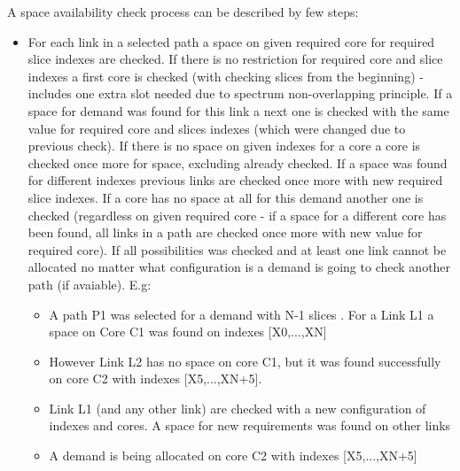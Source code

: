\documentclass[conference]{IEEEtran}
\begin{document}
A space availability check process can be described by few steps:
\begin{itemize}
\item For each link in a selected path a space on given required core for required slice indexes are checked. If there is no restriction for required core and slice indexes a first core is checked (with checking slices from the beginning) - includes one extra slot needed due to spectrum non-overlapping principle. If a space for demand was found for this link a next one is checked with the same value for required core and slices indexes (which were changed due to previous check). If there is no space on given indexes for a core a core is checked once more for space, excluding already checked. If a space was found for different indexes previous links are checked once more with new required slice indexes. If a core has no space at all for this demand another one is checked (regardless on given required core - if a space for a different core has been found, all links in a path are checked once more with new value for required core). If all possibilities was checked and at least one link cannot be allocated no matter what configuration is a demand is going to check another path (if avaiable). E.g:
  \begin{itemize}
  \item A path P1 was selected for a demand with N-1 slices . For a Link L1 a space on Core C1 was found on indexes [X0,...,XN]
  \item However Link L2 has no space on core C1, but it was found successfully on core C2 with indexes [X5,...,XN+5].
  \item Link L1 (and any other link) are checked with a new configuration of indexes and cores. A space for new requirements was found on other links
  \item A demand is being allocated on core C2 with indexes [X5,...,XN+5]
  \end{itemize}
\end{itemize}
\end{document}

